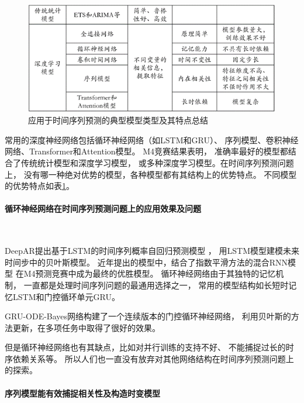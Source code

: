   \begin{figure}
    \centering
    \includegraphics[width=\linewidth]{figures/预测典型模型.png}
    \caption{应用于时间序列预测的典型模型类型及其特点总结}
    \label{tab:prediction models}
  \end{figure}
  常用的深度神经网络包括循环神经网络（如LSTM和GRU）、
  序列模型、卷积神经网络、Transformer和Attention模型。
  M4竞赛结果表明\cite{MAKRIDAKIS202054}，
  准确率最好的模型都结合了传统统计模型和深度学习模型，
  或多种深度学习模型。在时间序列预测问题上，
  没有哪一种绝对优势的模型，各种模型都有其结构上的优势特点。
  不同模型的优势特点如表\ref{tab:prediction models}。

  \paragraph{循环神经网络在时间序列预测问题上的应用效果及问题}~{}

    DeepAR提出基于LSTM的时间序列概率自回归预测模型
    \cite{salinas2020deepar}，
    用LSTM模型建模未来时间步中的贝叶斯模型。
    近年提出的模型中，结合了指数平滑方法的混合RNN模型\cite{smyl2020hybrid}
    在M4预测竞赛中成为最终的优胜模型\cite{MAKRIDAKIS202054}。
    循环神经网络由于其独特的记忆机制\cite{hewamalage2021recurrent}，
    一直都是处理时间序列问题的最通用选择之一，
    常用的模型结构如长短时记忆LSTM和门控循环单元GRU。

    GRU-ODE-Bayes网络\cite{de2019gru}构建了一个连续版本的门控循环神经网络，
    利用贝叶斯的方法更新，在多项任务中取得了很好的效果。

    但是循环神经网络也有其缺点，比如对并行训练的支持不好、
    不能捕捉过长的时序依赖关系等。
    所以人们也一直没有放弃对其他网络结构在时间序列预测问题上的探索。

  \paragraph{序列模型能有效捕捉相关性及构造时变模型}~{}

